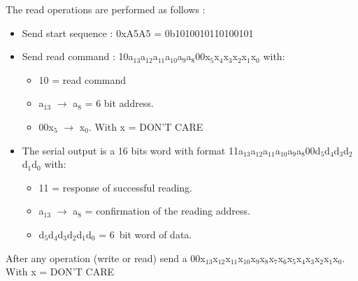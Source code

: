 \noindent The read operations are performed as follows :
\begin{itemize}
	\item Send start sequence : 0xA5A5 = 0b1010010110100101
	\item Send read command : 10a$_{13}$a$_{12}$a$_{11}$a$_{10}$a$_{9}$a$_{8}$00x$_{5}$x$_{4}$x$_{3}$x$_{2}$x$_{1}$x$_{0}$ with:
	\begin{itemize}
		\item 10 = read command
		\item a$_{13}$ $\rightarrow$ a$_{8}$ = 6 bit address.
		\item 00x$_{5}$ $\rightarrow$ x$_{0}$. With x = DON'T CARE 
	\end{itemize}
	\item The serial output is a 16 bits word with format 11a$_{13}$a$_{12}$a$_{11}$a$_{10}$a$_{9}$a$_{8}$00d$_{5}$d$_{4}$d$_{3}$d$_{2}$d$_{1}$d$_{0}$ with:
	\begin{itemize}
		\item 11 = response of successful reading.
		\item a$_{13}$ $\rightarrow$ a$_{8}$ = confirmation of the reading address.
		\item d$_{5}$d$_{4}$d$_{3}$d$_{2}$d$_{1}$d$_{0}$ = 6~bit word of data.
	\end{itemize}
\end{itemize}
\noindent After any operation (write or read) send a 00x$_{13}$x$_{12}$x$_{11}$x$_{10}$x$_{9}$x$_{8}$x$_{7}$x$_{6}$x$_{5}$x$_{4}$x$_{3}$x$_{2}$x$_{1}$x$_{0}$. With x = DON'T CARE
